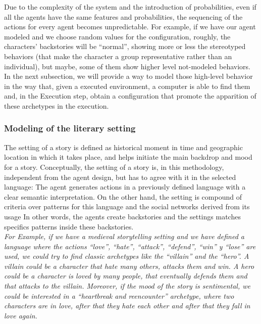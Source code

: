 \documentclass{sig-alternate}
\begin{document}

Due to the complexity of the system and the introduction of probabilities, even if all the agents have the same features and probabilities, the sequencing of the actions for every agent becomes unpredictable. For example, if we have our agent modeled and we choose random values for the configuration, roughly, the characters' backstories will be ``normal'', showing more or less the stereotyped behaviors (that make the character a group representative rather than an individual), but maybe, some of them show higher level not-modeled behaviors. In the next subsection, we will provide a way to model those high-level behavior in the way that, given a executed environment, a computer is able to find them 
and, in the Execution step, obtain a configuration that promote the apparition of these archetypes in the execution.

\subsubsection{Modeling of the literary setting}


The setting of a story is defined as historical moment in time and geographic location in which it takes place, and helps initiate the main backdrop and mood for a story.
Conceptually, the setting of a story is, in this methodology, independent from the agent design, but has to agree with it in the selected language: 
The agent generates actions in a previously defined language with a clear semantic interpretation. On the other hand, the setting is compound of criteria over patterns for this language and the social networks derived from its usage In other words, the agents create backstories and the settings matches specifics patterns inside these backstories.\\

\textit{For Example, if we have a medieval storytelling setting and we have defined a language where the actions ``love'', ``hate'', ``attack'', ``defend'', ``win'' y ``lose'' are used, we could try to find classic 
archetypes like the ``villain'' and the ``hero''. A villain could be a character that hate many others, attacks them and win. A hero could be a character is loved by many people, that eventually defends them and that attacks to the villain. Moreover, if the mood of the story is sentimental, we could be interested in a ``heartbreak and reencounter'' archetype, where two characters are in love, after that they hate each other and after that they fall in love again.}\\
\end{document}
